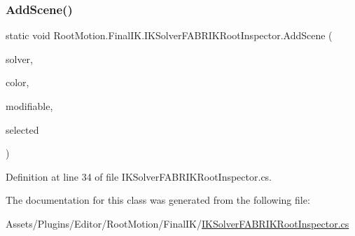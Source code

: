 \subsubsection{\texorpdfstring{Add\+Scene()}{AddScene()}}
{\footnotesize\ttfamily static void Root\+Motion.\+Final\+I\+K.\+I\+K\+Solver\+F\+A\+B\+R\+I\+K\+Root\+Inspector.\+Add\+Scene (\begin{DoxyParamCaption}\item[{I\+K\+Solver\+F\+A\+B\+R\+I\+K\+Root}]{solver,  }\item[{Color}]{color,  }\item[{bool}]{modifiable,  }\item[{ref F\+A\+B\+R\+I\+K\+Chain}]{selected }\end{DoxyParamCaption})\hspace{0.3cm}{\ttfamily [static]}}



Definition at line 34 of file I\+K\+Solver\+F\+A\+B\+R\+I\+K\+Root\+Inspector.\+cs.



The documentation for this class was generated from the following file\+:\begin{DoxyCompactItemize}
\item 
Assets/\+Plugins/\+Editor/\+Root\+Motion/\+Final\+I\+K/\mbox{\hyperlink{_i_k_solver_f_a_b_r_i_k_root_inspector_8cs}{I\+K\+Solver\+F\+A\+B\+R\+I\+K\+Root\+Inspector.\+cs}}\end{DoxyCompactItemize}
